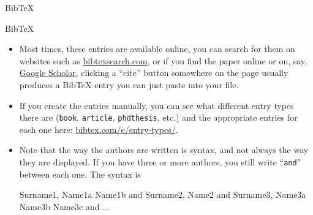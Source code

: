 \documentclass{beamer}
\begin{document}
\begin{frame}{Bib\TeX}
\begin{center}
        \end{center}
    \end{frame}

    \begin{frame}{Bib\TeX}
        \begin{itemize}
            \item Most times, these entries are available online, you can search for them on websites such as \href{http://bibtexsearch.com}{\ttfamily bibtexsearch.com}, or if you find the paper online or on, say, \href{https://scholar.google.com}{Google Scholar}, clicking a ``cite'' button somewhere on the page usually produces a Bib\TeX{} entry you can just paste into your file.
            
            \item If you create the entries manually, you can see what different entry types there are (\texttt{book}, \texttt{article}, \texttt{phdthesis}, etc.) and the appropriate entries for each one here: \href{https://www.bibtex.com/e/entry-types/}{\ttfamily bibtex.com/e/entry-types/}.
            
            \item Note that the way the authors are written is syntax, and not always the way they are displayed. If you have three or more authors, you still write ``\texttt{and}'' between each one. The syntax is
            \begin{center}
                \ttfamily
                Surname1, Name1a Name1b and Surname2, Name2 and Surname3, Name3a Name3b Name3c and ...
            \end{center}
        \end{itemize}
    \end{frame}
\end{document}

